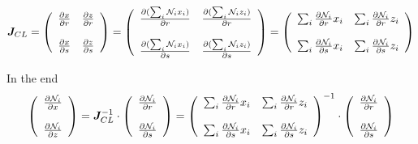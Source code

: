 \[
{\bm J}_{CL}
=
\left(
\begin{array}{cc}
\frac{\partial x}{\partial r}  & 
\frac{\partial z}{\partial r}   \\ \\
\frac{\partial x}{\partial s}  & 
\frac{\partial z}{\partial s}  
\end{array}
\right)
=
\left(
\begin{array}{cc}
\frac{\partial (\sum_i {\mathcal{N}}_i x_i)}{\partial r}  & 
\frac{\partial (\sum_i {\mathcal{N}}_i z_i)}{\partial r}   \\ \\
\frac{\partial (\sum_i {\mathcal{N}}_i x_i)}{\partial s}  & 
\frac{\partial (\sum_i {\mathcal{N}}_i z_i)}{\partial s}  
\end{array}
\right)
=
\left(
\begin{array}{cc}
\sum_i\frac{\partial {\mathcal{N}}_i}{\partial r}x_i  & 
\sum_i\frac{\partial {\mathcal{N}}_i}{\partial r}z_i   \\ \\
\sum_i\frac{\partial {\mathcal{N}}_i}{\partial s}x_i  & 
\sum_i\frac{\partial {\mathcal{N}}_i}{\partial s}z_i  
\end{array}
\right)
\]

In the end
\begin{equation}
\left(
\begin{array}{c}
\frac{\partial {\mathcal{N}}_i}{\partial x} \\ \\
\frac{\partial {\mathcal{N}}_i}{\partial z} 
\end{array}
\right)
=
{\bm J}_{CL}^{-1} \cdot 
\left(
\begin{array}{c}
\frac{\partial {\mathcal{N}}_i}{\partial r} \\ \\
\frac{\partial {\mathcal{N}}_i}{\partial s} 
\end{array}
\right)
=
\left(
\begin{array}{cc}
\sum_i\frac{\partial {\mathcal{N}}_i}{\partial r}x_i  & 
\sum_i\frac{\partial {\mathcal{N}}_i}{\partial r}z_i   \\ \\
\sum_i\frac{\partial {\mathcal{N}}_i}{\partial s}x_i  & 
\sum_i\frac{\partial {\mathcal{N}}_i}{\partial s}z_i  
\end{array}
\right)^{-1}
\cdot
\left(
\begin{array}{c}
\frac{\partial {\mathcal{N}}_i}{\partial r} \\ \\
\frac{\partial {\mathcal{N}}_i}{\partial s} 
\end{array}
\right)
\label{eq:mappDJ1}
\end{equation}

